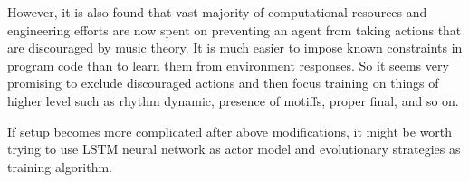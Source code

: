 \documentclass{article}
\begin{document}
However, it is also found that vast majority of computational resources and engineering efforts are now spent on preventing an agent from taking actions that are discouraged by music theory. It is much easier to impose known constraints in program code than to learn them from environment responses. So it seems very promising to exclude discouraged actions and then focus training on things of higher level such as rhythm dynamic, presence of motiffs, proper final, and so on.

If setup becomes more complicated after above modifications, it might be worth trying to use LSTM neural network as actor model and evolutionary strategies as training algorithm.


  

\end{document}
